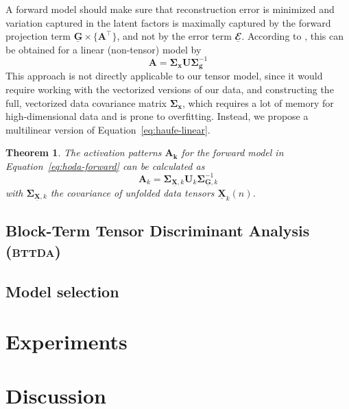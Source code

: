 \documentclass[twocolumn]{article}
\newcommand{\ten}[1]{\underline{\mathbf{#1}}} %
\newcommand{\mat}[1]{\mathbf{#1}} %
\renewcommand{\vec}[1]{\mathbf{#1}} %
\newcommand{\mmpr}[1]{\times\{#1\}} %
\newtheorem{theorem}{Theorem}
\begin{document}
A forward model should make sure that reconstruction error is minimized and
variation captured in the latent factors is maximally captured by the forward
projection term $\ten{G}\mmpr{\mat{A}^\intercal}$, and not by the error term
$\ten{\mathbfcal{E}}$.
According to \cite{Haufe2014}, this can be obtained for a linear (non-tensor)
model by
\begin{equation}
	\mat{A} = \mat{\Sigma}_\vec{x}\mat{U}\mat{\Sigma}_\vec{g}^{-1}
	\label{eq:haufe-linear}
\end{equation}
This approach is not directly applicable to our tensor model, since it would
require working with the vectorized versions of our data, and constructing the
full, vectorized data covariance matrix $\mat{\Sigma}_\vec{x}$, which requires
a lot of memory for high-dimensional data and is prone to overfitting.
Instead, we propose a multilinear version of Equation~\ref{eq:haufe-linear}.
\begin{theorem}
	The activation patterns $\mat{A_k}$ for the forward model in
	Equation~\ref{eq:hoda-forward} can be calculated as
	\begin{equation}
		\mat{A}_k = \mat{\Sigma}_{\ten{X},k}\mat{U}_k\mat{\Sigma}_{\ten{G},k}^{-1}
		\label{eq:ap}
	\end{equation}
	\label{the:ap}
	with $\mat{\Sigma}_{\ten{X},k}$ the covariance of unfolded data tensors
	$\ten{X}_k(n)$.
\end{theorem}

\subsection{Block-Term Tensor Discriminant Analysis (\textsc{bttda})}


\begin{figure*}
	\centering
	
\end{figure*}

\subsection{Model selection}

\section{Experiments}

\section{Discussion}
\end{document}
